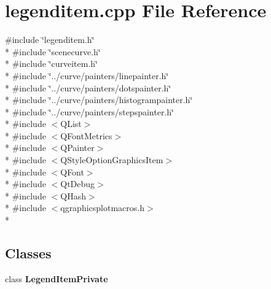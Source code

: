 \section{legenditem.\+cpp File Reference}
\label{bk3_2items_2legenditem_8cpp}
{\ttfamily \#include \char`\"{}legenditem.\+h\char`\"{}}\\*
{\ttfamily \#include \char`\"{}scenecurve.\+h\char`\"{}}\\*
{\ttfamily \#include \char`\"{}curveitem.\+h\char`\"{}}\\*
{\ttfamily \#include \char`\"{}../curve/painters/linepainter.\+h\char`\"{}}\\*
{\ttfamily \#include \char`\"{}../curve/painters/dotspainter.\+h\char`\"{}}\\*
{\ttfamily \#include \char`\"{}../curve/painters/histogrampainter.\+h\char`\"{}}\\*
{\ttfamily \#include \char`\"{}../curve/painters/stepspainter.\+h\char`\"{}}\\*
{\ttfamily \#include $<$Q\+List$>$}\\*
{\ttfamily \#include $<$Q\+Font\+Metrics$>$}\\*
{\ttfamily \#include $<$Q\+Painter$>$}\\*
{\ttfamily \#include $<$Q\+Style\+Option\+Graphics\+Item$>$}\\*
{\ttfamily \#include $<$Q\+Font$>$}\\*
{\ttfamily \#include $<$Qt\+Debug$>$}\\*
{\ttfamily \#include $<$Q\+Hash$>$}\\*
{\ttfamily \#include $<$qgraphicsplotmacros.\+h$>$}\\*
\subsection*{Classes}
\begin{DoxyCompactItemize}
\item 
class {\bf Legend\+Item\+Private}
\end{DoxyCompactItemize}
